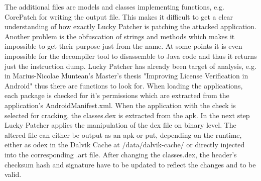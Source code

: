 The additional files are models and classes implementing functions, e.g. CorePatch for writing the output file.
This makes it difficult to get a clear understanding of how exactly Lucky Patcher is patching the attacked application.
Another problem is the obfuscation of strings and methods which makes it impossible to get their purpose just from the name.
At some points it is even impossible for the decompiler tool to disassemble to Java code and thus it returns just the instruction dump.
\newline
Lucky Patcher has already been target of analysis, e.g. in Marius-Nicolae Muntean's Master's thesis "Improving License Verification in Android" \cite{munteanLicense}
thus there are functions to look for.
When loading the applications, each package is checked for it's permissions which are extracted from the application's AndroidManifest.xml.
When the application with the check is selected for cracking, the classes.dex is extracted from the \gls{apk}.
In the next step Lucky Patcher applies the manipulation of the \gls{dex} file on binary level.
The altered file can either be output as an \gls{apk} or put, depending on the runtime, either as \gls{odex} in the Dalvik Cache at /data/dalvik-cache/ or directly injected into the corresponding .art file.
After changing the classes.dex, the header's checksum hash and signature have to be updated to reflect the changes and to be valid.
\cite{munteanLicense}
%
